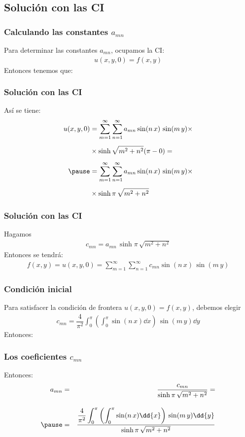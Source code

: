 \subsection{Solución con las CI}
\begin{frame}
\frametitle{Calculando las constantes $a_{mn}$}
Para determinar las constantes $a_{mn}$, ocupamos la CI:
\begin{align*}
u(x, y, 0) = f(x, y)
\end{align*}
Entonces tenemos que:
\end{frame}
\begin{frame}
\frametitle{Solución con las CI}
Así se tiene:
\begin{eqnarray*}
u(x, y, 0) &= \displaystyle \sum_{m=1}^{\infty} \sum_{n=1}^{\infty} a_{mn} \sin (n \, x) \, \sin (m \, y) \times \\[0.5em]
&\times \sinh \sqrt{m^{2} + n^{2}}(\pi - 0) = \\[0.5em] \pause
&= \displaystyle \sum_{m=1}^{\infty} \sum_{n=1}^{\infty} a_{mn} \sin (n \, x) \, \sin (m \, y) \times \\[0.5em]
&\times \sinh \pi \, \sqrt{m^{2} + n^{2}} 
\end{eqnarray*}
\end{frame}
\begin{frame}
\frametitle{Solución con las CI}
Hagamos
\begin{align*}
c_{mn} = a_{mn} \, \sinh \pi \, \sqrt{m^{2} + n^{2}}
\end{align*}
\pause
Entonces se tendrá:
\begin{align*}
f(x, y) = u(x, y, 0) = \sum_{m=1}^{\infty} \sum_{n=1}^{\infty} c_{mn} \sin (n \, x) \, \sin (m \, y)
\end{align*}
\end{frame}
\begin{frame}
\frametitle{Condición inicial}
Para satisfacer la condición de frontera $u(x, y, 0) = f(x, y)$, debemos elegir
\begin{align*}
c_{mn} = \dfrac{4}{\pi^{2}} \int_{0}^{\pi} \left( \int_{0}^{\pi} \sin (n \, x) \dd{x} \right) \, \sin (m \, y) \dd{y}
\end{align*}
Entonces:
\end{frame}
\begin{frame}
\frametitle{Los coeficientes $c_{mn}$}
Entonces:
\begin{eqnarray*}
a_{mn} &=& \dfrac{c_{mn}}{\sinh \pi \, \sqrt{m^{2} + n^{2}}} = \\[1em] \pause
&=& \dfrac{\displaystyle \dfrac{4}{\pi^{2}} \int_{0}^{\pi} \left( \int_{0}^{\pi} \sin (n \, x) \dd{x} \right) \, \sin (m \, y) \dd{y}}{\sinh \pi \, \sqrt{m^{2} + n^{2}}}
\end{eqnarray*}
\end{frame}
